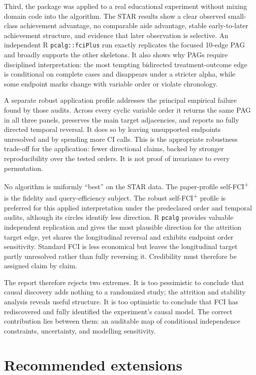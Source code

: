 \documentclass[11pt,a4paper,oneside]{report}
\newcommand{\FCIplus}{FCI\textsuperscript{+}}
\newcommand{\code}[1]{\texttt{#1}}
\begin{document}
Third, the package was applied to a real educational experiment without
mixing domain code into the algorithm. The STAR results show a clear observed
small-class achievement advantage, no comparable aide advantage, stable
early-to-later achievement structure, and evidence that later observation is
selective. An independent R \code{pcalg::fciPlus} run exactly replicates the
focused 10-edge PAG and broadly supports the other skeletons. It also shows
why PAGs require disciplined interpretation: the most tempting bidirected
treatment-outcome edge is conditional on complete cases and disappears under a
stricter alpha, while some endpoint marks change with variable order or violate
chronology.

A separate robust application profile addresses the principal empirical
failure found by those audits. Across every cyclic variable order it returns
the same PAG in all three panels, preserves the main target adjacencies, and
reports no fully directed temporal reversal. It does so by leaving unsupported
endpoints unresolved and by spending more CI calls. This is the appropriate
robustness trade-off for the application: fewer directional claims, backed by
stronger reproducibility over the tested orders. It is not proof of invariance
to every permutation.

No algorithm is uniformly ``best'' on the STAR data. The paper-profile
self-\FCIplus{} is the fidelity and query-efficiency subject. The robust
self-\FCIplus{} profile is preferred for this applied interpretation under
the predeclared order and temporal audits, although its circles identify less
direction. R \code{pcalg} provides
valuable independent replication and gives the most plausible direction for
the attrition target edge, yet shares the longitudinal reversal and exhibits
endpoint order sensitivity. Standard FCI is less economical but leaves the
longitudinal target partly unresolved rather than fully reversing it.
Credibility must therefore be assigned claim by claim.

The report therefore rejects two extremes. It is too pessimistic to conclude
that causal discovery adds nothing to a randomized study; the attrition and
stability analysis reveals useful structure. It is too optimistic to conclude
that FCI has rediscovered and fully identified the experiment's causal model.
The correct contribution lies between them: an auditable map of conditional
independence constraints, uncertainty, and modelling sensitivity.

\section{Recommended extensions}
\end{document}
